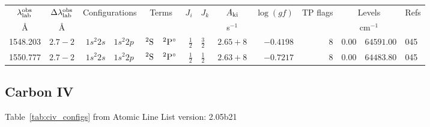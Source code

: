 



\begin{table*}
\begin{tabular}{rrr@{ -- }lr@{ -- }lr@{ -- }llrrr@{ -- }rl}
\hline
\multicolumn{1}{c}{$\lambda_{\rm lab}^{\rm obs}$\phantom{0000}} & \multicolumn{1}{c}{$\Delta\lambda_{\rm lab}^{\rm obs}$} & \multicolumn{2}{c}{Configurations} & \multicolumn{2}{c}{Terms} & $J_i$ & $J_k$ & \multicolumn{1}{c}{$A_{\rm ki}$} & \multicolumn{1}{c}{$\log(gf)$} & TP flags & \multicolumn{2}{c}{Levels} & Refs \\
\multicolumn{1}{c}{\AA\phantom{0000}} & \multicolumn{1}{c}{\AA} & \multicolumn{2}{c}{} & \multicolumn{2}{c}{} & \multicolumn{2}{c}{} & \multicolumn{1}{c}{s$^{-1}$} & & & \multicolumn{2}{c}{cm$^{-1}$} & \\
\hline
   1548.203\phantom{0000000} & $2.7-2$ &  $1s^{2}2s$ & $1s^{2}2p$  &       $^{2}{\rm S}$ & $^{2}{\rm P}^\circ$ &  $\frac{1}{2}$ & $\frac{3}{2}$  & $2.65+8$ & $ -0.4198$ &     8 &      $0.00$ &  $64591.00$ & 045 \\
   1550.777\phantom{0000000} & $2.7-2$ &  $1s^{2}2s$ & $1s^{2}2p$  &       $^{2}{\rm S}$ & $^{2}{\rm P}^\circ$ &  $\frac{1}{2}$ & $\frac{1}{2}$  & $2.63+8$ & $ -0.7217$ &     8 &      $0.00$ &  $64483.80$ & 045 \\
\hline
\end{tabular}
\end{table*}



\subsection{Carbon IV}
Table~\ref{tab:civ_configs} from 
Atomic Line List version: 2.05b21  
\citep{Tunklev1997} \\

